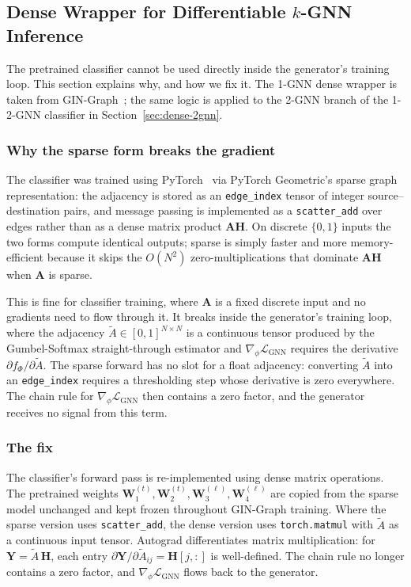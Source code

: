 \documentclass[12pt,a4paper]{article}
\begin{document}
\subsection{Dense Wrapper for Differentiable $k$-GNN Inference}
\label{sec:dense-wrapper}

The pretrained classifier cannot be used directly inside the generator's training loop. This section explains why, and how we fix it. The 1-GNN dense wrapper is taken from GIN-Graph~\cite{sun2025gingraph}; the same logic is applied to the 2-GNN branch of the 1-2-GNN classifier in Section~\ref{sec:dense-2gnn}.

\subsubsection{Why the sparse form breaks the gradient}

The classifier was trained using PyTorch~\cite{paszke2019pytorch} via PyTorch Geometric's sparse graph representation: the adjacency is stored as an \texttt{edge\_index} tensor of integer source--destination pairs, and message passing is implemented as a \texttt{scatter\_add} over edges rather than as a dense matrix product $\mathbf{A}\mathbf{H}$. On discrete $\{0,1\}$ inputs the two forms compute identical outputs; sparse is simply faster and more memory-efficient because it skips the $O(N^2)$ zero-multiplications that dominate $\mathbf{A}\mathbf{H}$ when $\mathbf{A}$ is sparse.

This is fine for classifier training, where $\mathbf{A}$ is a fixed discrete input and no gradients need to flow through it. It breaks inside the generator's training loop, where the adjacency $\tilde{A} \in [0,1]^{N \times N}$ is a continuous tensor produced by the Gumbel-Softmax straight-through estimator and $\nabla_\phi \mathcal{L}_{\text{GNN}}$ requires the derivative $\partial f_\Phi / \partial \tilde{A}$. The sparse forward has no slot for a float adjacency: converting $\tilde{A}$ into an \texttt{edge\_index} requires a thresholding step whose derivative is zero everywhere. The chain rule for $\nabla_\phi \mathcal{L}_{\text{GNN}}$ then contains a zero factor, and the generator receives no signal from this term.

\subsubsection{The fix}

The classifier's forward pass is re-implemented using dense matrix operations. The pretrained weights $\mathbf{W}_1^{(t)}, \mathbf{W}_2^{(t)}, \mathbf{W}_3^{(\ell)}, \mathbf{W}_4^{(\ell)}$ are copied from the sparse model unchanged and kept frozen throughout GIN-Graph training. Where the sparse version uses \texttt{scatter\_add}, the dense version uses \texttt{torch.matmul} with $\tilde{A}$ as a continuous input tensor. Autograd differentiates matrix multiplication: for $\mathbf{Y} = \tilde{A}\,\mathbf{H}$, each entry $\partial \mathbf{Y} / \partial \tilde{A}_{ij} = \mathbf{H}[j,:]$ is well-defined. The chain rule no longer contains a zero factor, and $\nabla_\phi \mathcal{L}_{\text{GNN}}$ flows back to the generator.
\end{document}
